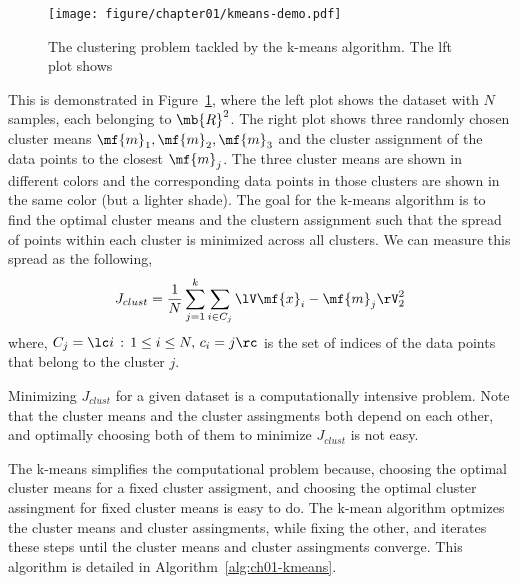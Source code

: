 \begin{figure}
    \centering
    \texttt{[image: figure/chapter01/kmeans-demo.pdf]}
    \caption{The clustering problem tackled by the k-means algorithm. The lft plot shows  }
    \label{fig:ch01-kmeans-demo}
\end{figure}

This is demonstrated in Figure~\ref{fig:ch01-kmeans-demo}, where the left plot shows the dataset with $N$ samples, each belonging to $\mb{R}^2$. The right plot shows three randomly chosen cluster means $\mf{m}_1, \mf{m}_2, \mf{m}_3$ and the cluster assignment of the data points to the closest $\mf{m}_j$. The three cluster means are shown in different colors and the corresponding data points in those clusters are shown in the same color (but a lighter shade). The goal for the k-means algorithm is to find the optimal cluster means and the clustern assignment such that the spread of points within each cluster is minimized across all clusters. We can measure this spread as the following,
\begin{equation}
    J_{clust} = \frac{1}{N}\sum_{j=1}^k \sum_{i \in C_j} \lV \mf{x}_i - \mf{m}_j \rV_2^2
    \label{eq:ch01-kmeans-cost}
\end{equation}
where, $C_j = \lc i \, : \, 1 \leq i \leq N, \, c_i = j\rc$ is the set of indices of the data points that belong to the cluster $j$.

Minimizing $J_{clust}$ for a given dataset is a computationally intensive problem. Note that the cluster means and the cluster assingments both depend on each other, and optimally choosing both of them to minimize $J_{clust}$ is not easy. 

The k-means simplifies the computational problem because, choosing the optimal cluster means for a fixed cluster assigment, and choosing the optimal cluster assingment for fixed cluster means is easy to do. The k-mean algorithm optmizes the cluster means and cluster assingments, while fixing the other, and iterates these steps until the cluster means and cluster assingments converge. This algorithm is detailed in Algorithm~\ref{alg:ch01-kmeans}.

